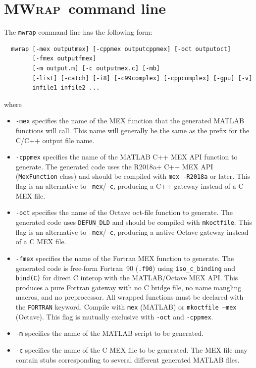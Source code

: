 \documentclass[12pt]{article}
\newcommand{\mwrap}{\textsc{MWrap}}
\begin{document}
\section{\mwrap\ command line}

The {\tt mwrap} command line has the following form:
\begin{verbatim}
  mwrap [-mex outputmex] [-cppmex outputcppmex] [-oct outputoct]
        [-fmex outputfmex]
        [-m output.m] [-c outputmex.c] [-mb]
        [-list] [-catch] [-i8] [-c99complex] [-cppcomplex] [-gpu] [-v]
        infile1 infile2 ...
\end{verbatim}
where
\begin{itemize}

\item {\tt -mex} specifies the name of the MEX function that the
  generated MATLAB functions will call.  This name will generally be
  the same as the prefix for the C/C++ output file name.

\item {\tt -cppmex} specifies the name of the MATLAB C++ MEX API function
  to generate.  The generated code uses the R2018a+ C++ MEX API
  ({\tt MexFunction} class) and should be compiled with
  {\tt mex -R2018a} or later.  This flag is an alternative to
  {\tt -mex}/{\tt -c}, producing a C++ gateway instead of a C MEX file.

\item {\tt -oct} specifies the name of the Octave oct-file function to
  generate.  The generated code uses {\tt DEFUN\_DLD} and should be
  compiled with {\tt mkoctfile}.  This flag is an alternative to
  {\tt -mex}/{\tt -c}, producing a native Octave gateway instead of a
  C MEX file.

\item {\tt -fmex} specifies the name of the Fortran MEX function to
  generate.  The generated code is free-form Fortran~90 ({\tt .f90})
  using {\tt iso\_c\_binding} and {\tt bind(C)} for direct C interop
  with the MATLAB/Octave MEX API.  This produces a pure Fortran
  gateway with no C bridge file, no name mangling macros, and no
  preprocessor.  All wrapped functions must be declared with the
  {\tt FORTRAN} keyword.  Compile with {\tt mex} (MATLAB) or
  {\tt mkoctfile --mex} (Octave).  This flag is mutually exclusive
  with {\tt -oct} and {\tt -cppmex}.

\item {\tt -m} specifies the name of the MATLAB script to be
  generated.

\item {\tt -c} specifies the name of the C MEX file to be generated.
  The MEX file may contain stubs corresponding to several different
  generated MATLAB files.


\end{itemize}
\end{document}

